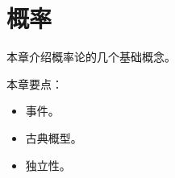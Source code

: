 \chapter{概率}

本章介绍概率论的几个基础概念。

本章要点：
\begin{itemize}
    \item 事件。
    \item 古典概型。
    \item 独立性。
\end{itemize}

\newpage


\newpage


\newpage


\newpage





